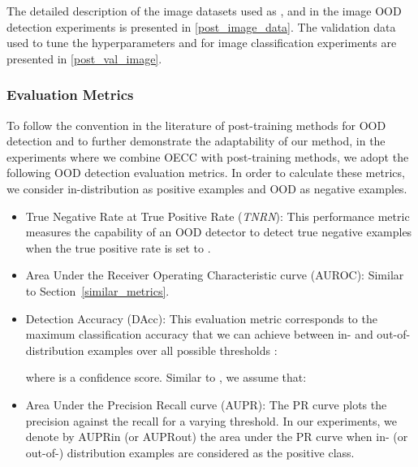 \documentclass{article} \usepackage{iclr2020_conference,times}
\begin{document}
The detailed description of the image datasets used as ,  and  in the image OOD detection experiments is presented in \ref{post_image_data}. The validation data  used to tune the hyperparameters  and  for image classification experiments are presented in \ref{post_val_image}.


\subsubsection{Evaluation Metrics}
To follow the convention in the literature of post-training methods for OOD detection \citep{Lee:2018:SUF:3327757.3327819,ch2019detecting,2017arXiv170602690L, Zisselman_2020_CVPR} and to further demonstrate the adaptability of our method, in the experiments where we combine OECC with post-training methods, we adopt the following OOD detection evaluation metrics. In order to calculate these metrics, we consider in-distribution as positive examples and OOD as negative examples.

\addtolength{\leftskip}{0mm}
  \begin{itemize}[leftmargin=\dimexpr\parindent+0mm+0.5\relax]
  \item True Negative Rate at  True Positive Rate ({\it TNRN}):
  This performance metric measures the capability of an OOD detector to detect true negative examples when the true positive rate is set to .
  \item Area Under the Receiver Operating Characteristic curve (AUROC): Similar to Section~\ref{similar_metrics}. 
\item Detection Accuracy (DAcc): This evaluation metric corresponds to the maximum classification accuracy that we can achieve between in- and out-of-distribution examples over all possible thresholds :
  
  where  is a confidence score. Similar to \cite{Lee:2018:SUF:3327757.3327819}, we assume that:
  
  \item Area Under the Precision Recall curve (AUPR): The PR curve plots the precision against the recall for a varying threshold. In our experiments, we denote by AUPRin (or AUPRout) the area under the PR curve when in- (or out-of-) distribution examples are considered as the positive class.
\end{itemize}
\end{document}
